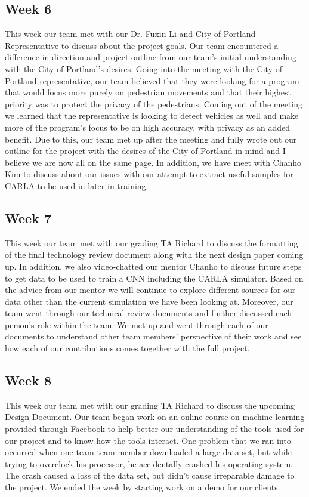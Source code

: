 \documentclass[onecolumn, draftclsnofoot,10pt, compsoc]{IEEEtran}
\begin{document}
\subsection{Week 6}
This week our team met with our Dr. Fuxin Li and City of Portland Representative to discuss about the project goals. Our team encountered a difference in direction and project outline from our team's initial understanding with the City of Portland’s desires. Going into the meeting with the City of Portland representative, our team believed that they were looking for a program that would focus more purely on pedestrian movements and that their highest priority was to protect the privacy of the pedestrians. Coming out of the meeting we learned that the representative is looking to detect vehicles as well and make more of the program’s focus to be on high accuracy, with privacy as an added benefit. Due to this, our team met up after the meeting and fully wrote out our outline for the project with the desires of the City of Portland in mind and I believe we are now all on the same page. In addition, we have meet with Chanho Kim to discuss about our issues with our attempt to extract useful samples for CARLA to be used in later in training.

\subsection{Week 7}
This week our team met with our grading TA Richard to discuss the formatting of the final technology review document along with the next design paper coming up. In addition, we also video-chatted our mentor Chanho to discuss future steps to get data to be used to train a CNN including the CARLA simulator. Based on the advice from our mentor we will continue to explore different sources for our data other than the current simulation we have been looking at. Moreover, our team went through our technical review documents and further discussed each person’s role within the team. We met up and went through each of our documents to understand other team members’ perspective of their work and see how each of our contributions comes together with the full project.

\subsection{Week 8}
This week our team met with our grading TA Richard to discuss the upcoming Design Document. Our team began work on an online course on machine learning provided through Facebook to help better our understanding of the tools used for our project and to know how the tools interact. One problem that we ran into occurred when one team team member downloaded a large data-set, but while trying to overclock his processor, he accidentally crashed his operating system. The crash caused a loss of the data set, but didn't cause irreparable damage to the project. We ended the week by starting work on a demo for our clients.
\end{document}
